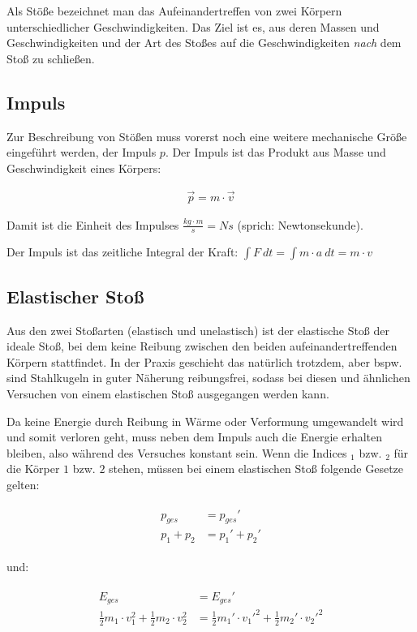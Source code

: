 Als Stöße bezeichnet man das Aufeinandertreffen von zwei Körpern unterschiedlicher Geschwindigkeiten. Das Ziel ist es, aus deren Massen und Geschwindigkeiten und der Art des Stoßes auf die Geschwindigkeiten \emph{nach} dem Stoß zu schließen.

\subsection{Impuls} \label{subsec:impuls}

Zur Beschreibung von Stößen muss vorerst noch eine weitere mechanische Größe eingeführt werden, der Impuls $p$. Der Impuls ist das Produkt aus Masse und Geschwindigkeit eines Körpers:

\begin{align}
	\vec{p} = m \cdot \vec{v}
\end{align}

\noindent Damit ist die Einheit des Impulses $\frac{kg \cdot m}{s} = Ns$ (sprich: \glqq Newtonsekunde\grqq).

\begin{NiceToKnow}
Der Impuls ist das zeitliche Integral der Kraft: $\int F \ dt = \int m \cdot a \ dt = m \cdot v$
\end{NiceToKnow}


\subsection{Elastischer Stoß}

Aus den zwei Stoßarten (elastisch und unelastisch) ist der elastische Stoß der ideale Stoß, bei dem keine Reibung zwischen den beiden aufeinandertreffenden Körpern stattfindet. In der Praxis geschieht das natürlich trotzdem, aber bspw. sind Stahlkugeln in guter Näherung reibungsfrei, sodass bei diesen und ähnlichen Versuchen von einem elastischen Stoß ausgegangen werden kann.

Da keine Energie durch Reibung in Wärme oder Verformung umgewandelt wird und somit \glqq verloren geht\grqq , muss neben dem Impuls auch die Energie erhalten bleiben, also während des Versuches konstant sein. Wenn die Indices $_1$ bzw. $_2$ für die Körper $1$ bzw. $2$ stehen, müssen bei einem elastischen Stoß folgende Gesetze gelten:

\begin{align}
\begin{split}
	p_{ges} &= p_{ges}' \\
	p_1 + p_2 &= p_1' + p_2'
\end{split}
\end{align}

\noindent und:

\begin{align}
\begin{split}
	E_{ges} &= E_{ges}' \\
	\frac{1}{2} m_1 \cdot v_1^2 + \frac{1}{2} m_2 \cdot v_2^2 &= \frac{1}{2} m_1' \cdot v_1'^2 + \frac{1}{2} m_2' \cdot v_2'^2
\end{split}
\end{align}

